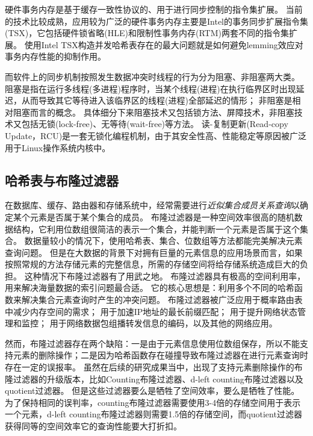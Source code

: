 硬件事务内存是基于缓存一致性协议的、用于进行同步控制的指令集扩展。
当前的技术比较成熟，应用较为广泛的硬件事务内存主要是Intel的事务同步扩展指令集(TSX)\cite{tsx}，它包括硬件锁省略(HLE)和限制性事务内存(RTM)两套不同的指令集扩展。
使用Intel TSX构造并发哈希表存在的最大问题就是如何避免lemming效应对事务内存性能的抑制作用。

而软件上的同步机制按照发生数据冲突时线程的行为分为阻塞、非阻塞两大类。
阻塞是指在运行多线程(多进程)程序时，当某个线程(进程)在执行临界区时出现延迟，从而导致其它等待进入该临界区的线程(进程)全部延迟的情形；
非阻塞是相对阻塞而言的概念。
具体细分下来阻塞技术又包括锁方法、屏障技术，非阻塞技术又包括无锁(lock-free)、无等待(wait-free)等方法。
读-复制更新(Read-copy Update，RCU)是一套无锁化编程机制，由于其安全性高、性能稳定等原因被广泛用于Linux操作系统内核中\cite{mckenney2003kernel,mckenney2004scaling,mckenney2013rcu}。

\subsection{哈希表与布隆过滤器}

在数据库、缓存、路由器和存储系统中，经常需要进行\textit{近似集合成员关系查询}以确定某个元素是否属于某个集合的成员。
布隆过滤器是一种空间效率很高的随机数据结构，它利用位数组很简洁的表示一个集合，并能判断一个元素是否属于这个集合。
数据量较小的情况下，使用哈希表、集合、位数组等方法都能完美解决元素查询问题。
但是在大数据的背景下对拥有巨量的元素信息的应用场景而言，如果按照常规的方法存储元素的完整信息，所需的存储空间将给存储系统造成巨大的负担。
这种情况下布隆过滤器有了用武之地。
布隆过滤器具有极高的空间利用率，用来解决海量数据的索引问题最合适。
它的核心思想是：利用多个不同的哈希函数来解决集合元素查询时产生的冲突问题。
布隆过滤器被广泛应用于概率路由表中减少内存空间的需求\cite{yu2009buffalo}；
用于加速IP地址的最长前缀匹配\cite{dharmapurikar2003longest}；
用于提升网络状态管理和监控\cite{bonomi2006beyond,song2005fast}；
用于网络数据包组播转发信息的编码\cite{jokela2009lipsin}，以及其他的网络应用\cite{broder2004network}。

然而，布隆过滤器存在两个缺陷：一是由于元素信息使用位数组保存，所以不能支持元素的删除操作；二是因为哈希函数存在碰撞导致布隆过滤器在进行元素查询时存在一定的误报率。
虽然在后续的研究成果当中，出现了支持元素删除操作的布隆过滤器的升级版本，比如Counting布隆过滤器\cite{fan2000summary}、d-left counting布隆过滤器\cite{bonomi2006improved}以及quotient过滤器\cite{bender2012don}。
但是这些过滤器要么是牺牲了空间效率，要么是牺牲了性能。
为了保持相同的误判率，counting布隆过滤器需要使用3-4倍的存储空间用于表示一个元素，d-left counting布隆过滤器则需要1.5倍的存储空间，而quotient过滤器获得同等的空间效率它的查询性能要大打折扣。

